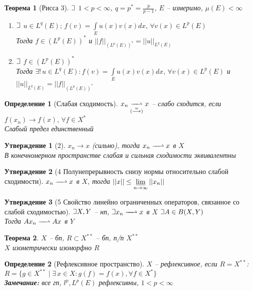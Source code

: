\documentclass{article}
\theoremstyle{truestyle}
\newtheorem*{defenition}{Определение}
\newtheorem*{theorem}{Теорема}
\newtheorem*{utv}{Утверждение}
\newcommand{\weakconv}{\xrightharpoonup{\quad\,}}
\def\letus{%
	\mathord{\setbox0=\hbox{$\exists$}%
		\hbox{\kern 0.125\wd0%
			\vbox to \ht0{%
				\hrule width 0.75\wd0%
				\vfill%
				\hrule width 0.75\wd0}%
			\vrule height \ht0%
			\kern 0.125\wd0}%
	}%
}
\begin{document}
\begin{theorem}[Рисса 3]
  $\letus$ $1 < p < \infty$, $q = p^* = \frac{p}{p-1}$, $E$ -- измеримо, $\mu(E) < \infty$ 
  \begin{enumerate}
    \item $\letus$ $u \in L^q(E); \, f(v) = \int\limits_{E} u(x) v(x) dx, \, \forall v(x) \in L^p(E)$\\
    Тогда $f \in (L^p(E))^*$ и $||f||_{(L^p(E))^*} = ||u||_{L^q(E)}$
    \item $\letus$ $f \in (L^p(E))^*$\\
    Тогда $\exists! \, u \in L^q(E): f(v) = \int\limits_{E} u(x) v(x) dx, \, \forall v(x) \in L^p(E)$ и $||u||_{L^q(E)} = ||f||_{(L^p(E))^*}$
  \end{enumerate}
\end{theorem}
    
\begin{defenition}[Слабая сходимость]
  $x_n \underset{(\overset{w}{\longrightarrow})}{\weakconv} x$ -- слабо сходится, если $f(x_n) \longrightarrow f(x), \, \forall f \in X^*$ \\
  Слабый предел единственный
\end{defenition}

\begin{utv}[2]
	$x_n \rightarrow x$ (сильно), тогда $x_n \weakconv x$ в $X$ \\
	В конечномерном пространстве слабая и сильная сходимости эквивалентны
\end{utv}

\begin{utv}[4 Полунепрерывность снизу нормы относительно слабой сходимости]
	$x_n \weakconv x$ в $X$, тогда $||x||\le \varliminf\limits_{n\rightarrow\infty} ||x_n||$
\end{utv}

\begin{utv}[5 Свойство линейно ограниченных операторов, связанное со слабой сходимостью]
	$\letus X, Y$ -- нп, $\letus x_n \weakconv x$ в $X$ $\letus A \in B(X, Y)$ \\
	Тогда $A x_n \weakconv A x$ в $Y$
\end{utv}

\begin{theorem}
	$X$ -- бп, $R \subset X^{**}$ -- бп, п/п $X^{**}$ \\
	$X$ изометрически изоморфно $R$
\end{theorem}

\begin{defenition}[Рефлексивное пространство]
  $X$ -- рефлексивное, если $R = X^{**}$:\\
  $R = \{g \in X^{**} \mid \exists \, x \in X: g(f) = f(x), \forall f \in X^* \}$ \\
  {\bf Замечание:} все гп, $l^p, L^p(E)$ рефлексивны, $1<p<\infty$
\end{defenition}
\end{document}
